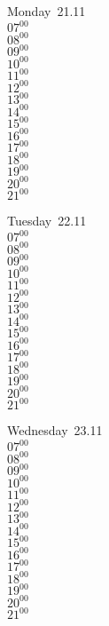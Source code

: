 \documentclass[11pt,a4paper]{book}\usepackage[]{graphicx}\usepackage[]{color}
\begin{document}
\begin{headerbox}
\end{headerbox}
\begin{weekdaybox}
  Monday~21.11\\
  { 
  \vfill
  $07^{00}$\\
$08^{00}$\\
$09^{00}$\\
$10^{00}$\\
$11^{00}$\\
$12^{00}$\\
$13^{00}$\\
$14^{00}$\\
$15^{00}$\\
$16^{00}$\\
$17^{00}$\\
$18^{00}$\\
$19^{00}$\\
$20^{00}$\\
$21^{00}$\\
  }
\end{weekdaybox}
\begin{weekdaybox}
  Tuesday~22.11\\
  { 
  \vfill
  $07^{00}$\\
$08^{00}$\\
$09^{00}$\\
$10^{00}$\\
$11^{00}$\\
$12^{00}$\\
$13^{00}$\\
$14^{00}$\\
$15^{00}$\\
$16^{00}$\\
$17^{00}$\\
$18^{00}$\\
$19^{00}$\\
$20^{00}$\\
$21^{00}$\\
  }
\end{weekdaybox}
\begin{weekdaybox}
  Wednesday~23.11\\
  { 
  \vfill
  $07^{00}$\\
$08^{00}$\\
$09^{00}$\\
$10^{00}$\\
$11^{00}$\\
$12^{00}$\\
$13^{00}$\\
$14^{00}$\\
$15^{00}$\\
$16^{00}$\\
$17^{00}$\\
$18^{00}$\\
$19^{00}$\\
$20^{00}$\\
$21^{00}$\\
  }
\end{weekdaybox}
\end{document}
